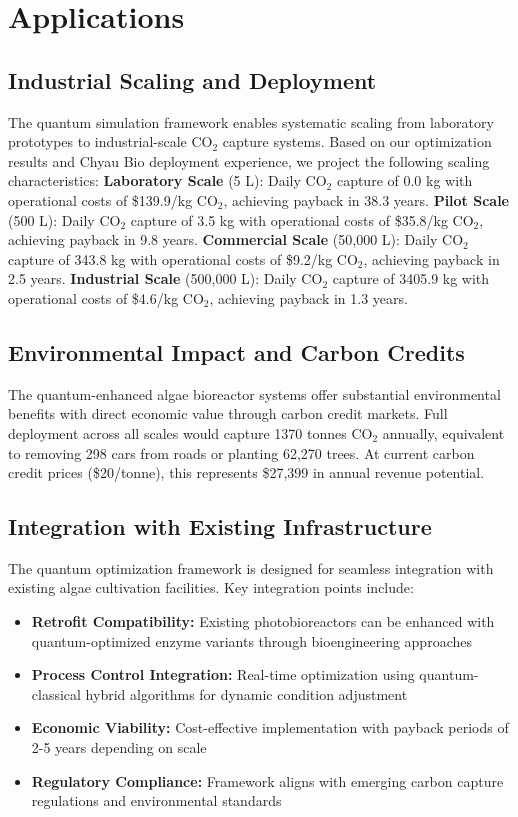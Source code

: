 
\section{Applications}

\subsection{Industrial Scaling and Deployment}

The quantum simulation framework enables systematic scaling from laboratory prototypes to industrial-scale CO$_2$ capture systems. Based on our optimization results and Chyau Bio deployment experience, we project the following scaling characteristics:
\textbf{
Laboratory Scale} (5 L): Daily CO$_2$ capture of 0.0 kg with operational costs of \$139.9/kg CO$_2$, achieving payback in 38.3 years.
\textbf{
Pilot Scale} (500 L): Daily CO$_2$ capture of 3.5 kg with operational costs of \$35.8/kg CO$_2$, achieving payback in 9.8 years.
\textbf{
Commercial Scale} (50,000 L): Daily CO$_2$ capture of 343.8 kg with operational costs of \$9.2/kg CO$_2$, achieving payback in 2.5 years.
\textbf{
Industrial Scale} (500,000 L): Daily CO$_2$ capture of 3405.9 kg with operational costs of \$4.6/kg CO$_2$, achieving payback in 1.3 years.

\subsection{Environmental Impact and Carbon Credits}

The quantum-enhanced algae bioreactor systems offer substantial environmental benefits with direct economic value through carbon credit markets.
Full deployment across all scales would capture 1370 tonnes CO$_2$ annually, equivalent to removing 298 cars from roads or planting 62,270 trees. At current carbon credit prices (\$20/tonne), this represents \$27,399 in annual revenue potential.

\subsection{Integration with Existing Infrastructure}

The quantum optimization framework is designed for seamless integration with existing algae cultivation facilities. Key integration points include:

\begin{itemize}
\item \textbf{Retrofit Compatibility:} Existing photobioreactors can be enhanced with quantum-optimized enzyme variants through bioengineering approaches
\item \textbf{Process Control Integration:} Real-time optimization using quantum-classical hybrid algorithms for dynamic condition adjustment
\item \textbf{Economic Viability:} Cost-effective implementation with payback periods of 2-5 years depending on scale
\item \textbf{Regulatory Compliance:} Framework aligns with emerging carbon capture regulations and environmental standards
\end{itemize}

